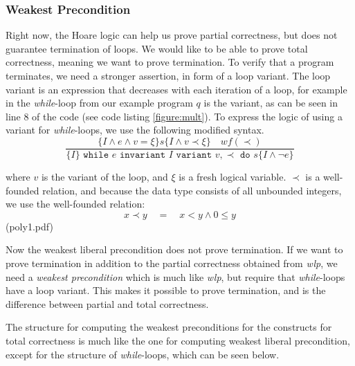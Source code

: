 \subsubsection{Weakest Precondition}
Right now, the Hoare logic can help us prove partial correctness, but does not guarantee termination of loops. We would like to be able to prove total correctness, meaning we want to prove termination. To verify that a program terminates, we need a stronger assertion, in form of a loop variant.
The loop variant is an expression that decreases with each iteration of a loop, for example in the \textit{while}-loop from our example program $q$ is the variant, as can be seen in line 8 of the code (see code listing \autoref{figure:mult}).
To express the logic of using a variant for \textit{while}-loops, we use the following modified syntax.
$$
	\frac{
		\{I \land e \land v = \xi \} s \{I \land v \prec \xi \} \quad wf(\prec)
	}{
		\{I\} \texttt{ while } e \texttt{ invariant } I 
          \texttt{ variant } v, \prec \texttt{ do } s \{I \land \neg e\}
	}
$$

where $v$ is the variant of the loop, and $\xi$ is a fresh logical variable. $\prec$ is a well-founded relation, and because the data type consists of all unbounded integers, we use the well-founded relation:
$$x \prec y \quad = \quad x < y \land 0 \leq y $$
(poly1.pdf)

Now the weakest liberal precondition does not prove termination. If we want to prove termination in addition to the partial correctness obtained from \textit{wlp}, we need a \textit{weakest precondition} which is much like \textit{wlp}, but require that \textit{while}-loops have a loop variant. 
This makes it possible to prove termination, and is the difference between partial and total correctness.

The structure for computing the weakest preconditions for the constructs for total correctness is much like the one for computing weakest liberal precondition, except for the structure of \textit{while}-loops, which can be seen below.

